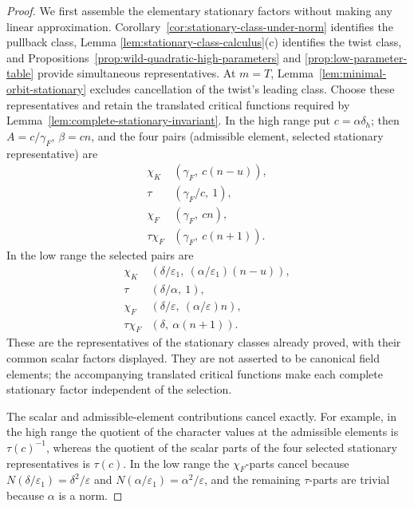\documentclass[11pt]{amsart}
\theoremstyle{definition}
\theoremstyle{remark}
\begin{document}
\begin{proof}
We first assemble the elementary stationary factors without making any
linear approximation.  Corollary~\ref{cor:stationary-class-under-norm}
identifies the pullback class, Lemma
\ref{lem:stationary-class-calculus}(c) identifies the twist class, and
Propositions~\ref{prop:wild-quadratic-high-parameters} and
\ref{prop:low-parameter-table} provide simultaneous representatives.
At $m=T$, Lemma~\ref{lem:minimal-orbit-stationary} excludes cancellation
of the twist's leading class.  Choose these representatives and retain
the translated critical functions required by
Lemma~\ref{lem:complete-stationary-invariant}.  In the high range put
$c=\alpha\delta_h$; then $A=c/\gamma_F$, $\beta=cn$, and the four pairs
(admissible element, selected stationary representative) are
\begin{equation}\label{eq:quadratic-high-four-pairs}
 \begin{array}{c|c}
 \chi_K&(\gamma_F,\ c(n-u)),\\
 \tau&(\gamma_F/c,\ 1),\\
 \chi_F&(\gamma_F,\ cn),\\
 \tau\chi_F&(\gamma_F,\ c(n+1)).
 \end{array}
\end{equation}
In the low range the selected pairs are
\begin{equation}\label{eq:quadratic-low-four-pairs}
 \begin{array}{c|c}
 \chi_K&(\delta/\varepsilon_1,\ (\alpha/\varepsilon_1)(n-u)),\\
 \tau&(\delta/\alpha,\ 1),\\
 \chi_F&(\delta/\varepsilon,\ (\alpha/\varepsilon)n),\\
 \tau\chi_F&(\delta,\ \alpha(n+1)).
 \end{array}
\end{equation}
These are the representatives of the stationary classes already proved,
with their common scalar factors displayed.  They are not asserted to
be canonical field elements; the accompanying translated critical
functions make each complete stationary factor independent of the
selection.

The scalar and admissible-element contributions cancel exactly.  For
example, in the high range the quotient of the character values at the
admissible elements is $\tau(c)^{-1}$, whereas the quotient of the
scalar parts of the four selected stationary representatives is
$\tau(c)$.  In the
low range the $\chi_F$-parts cancel because
$N(\delta/\varepsilon_1)=\delta^2/\varepsilon$ and
$N(\alpha/\varepsilon_1)=\alpha^2/\varepsilon$, and the remaining
$\tau$-parts are trivial because $\alpha$ is a norm.


\end{proof}
\end{document}
